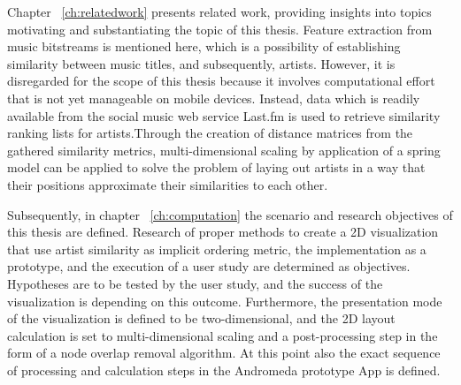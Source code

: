 Chapter ~\ref{ch:relatedwork} presents related work, providing insights into topics motivating and substantiating the topic of this thesis. Feature extraction from music bitstreams is mentioned here, which is a possibility of establishing similarity between music titles, and subsequently, artists. However, it is disregarded for the scope of this thesis because it involves computational effort that is not yet manageable on mobile devices. Instead, data which is readily available from the social music web service Last.fm is used to retrieve similarity ranking lists for artists.Through the creation of distance matrices from the gathered similarity metrics, multi-dimensional scaling by application of a spring model can be applied to solve the problem of laying out artists in a way that their positions approximate their similarities to each other.

Subsequently, in chapter ~\ref{ch:computation} the scenario and research objectives of this thesis are defined. Research of proper methods to create a 2D visualization that use artist similarity as implicit ordering metric, the implementation as a prototype, and the execution of a user study are determined as objectives. Hypotheses are to be tested by the user study, and the success of the visualization is depending on this outcome. Furthermore, the presentation mode of the visualization is defined to be two-dimensional, and the 2D layout calculation is set to multi-dimensional scaling and a post-processing step in the form of a node overlap removal algorithm. At this point also the exact sequence of processing and calculation steps in the Andromeda prototype App is defined.

